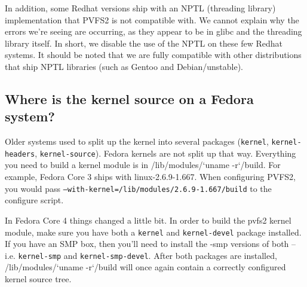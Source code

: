\documentclass[11pt,letterpaper]{article}
\begin{document}
In addition, some Redhat versions ship with an NPTL (threading
library) implementation that PVFS2 is not compatible with.  We cannot
explain why the errors we're seeing are occurring, as they appear to be
in glibc and the threading library itself.  In short, we disable the
use of the NPTL on these few Redhat systems.  It should be noted that
we are fully compatible with other distributions that ship NPTL
libraries (such as Gentoo and Debian/unstable).

\subsection{Where is the kernel source on a Fedora system?}

Older systems used to split up the kernel into several packages
(\texttt{kernel}, \texttt{kernel-headers}, \texttt{kernel-source}).
Fedora kernels are not split up that way.  Everything you need to build a
kernel module is in /lib/modules/`uname -r`/build.  For example, Fedora
Core 3 ships with linux-2.6.9-1.667.  When configuring PVFS2, you would
pass \texttt{--with-kernel=/lib/modules/2.6.9-1.667/build} to the
configure script.

In Fedora Core 4 things changed a little bit.  In order to build the pvfs2
kernel module, make sure you have both a \texttt{kernel} and
\texttt{kernel-devel} package installed.  If you have an SMP box, then you'll
need to install the -smp versions of both -- i.e. \texttt{kernel-smp} and
\texttt{kernel-smp-devel}.   After both packages are installed,
/lib/modules/`uname -r`/build will once again contain a correctly configured
kernel source tree.
\end{document}
